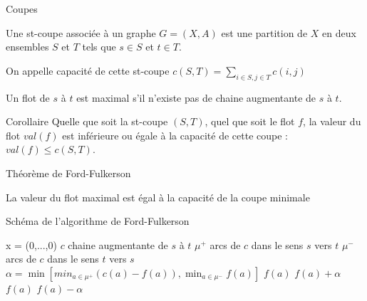 \begin{frame}{Coupes}
    \begin{definition}
        Une st-coupe associée à un graphe $G=(X,A)$ est une partition de $X$ en deux ensembles $S$ et $T$ tels que $s \in S$ et $t \in T$. 
        
        On appelle capacité de cette st-coupe $c(S,T) = \sum_{i \in S, j \in T} c(i,j)$ 
    \end{definition}
    \begin{theorem}
        Un flot de $s$ à $t$ est maximal s'il n'existe pas de chaine augmentante de $s$ à $t$.
    \end{theorem}
    \begin{block}{Corollaire}
        Quelle que soit la st-coupe $(S,T)$, quel que soit le flot $f$, la valeur du flot $val(f)$ est inférieure ou égale à la capacité de cette coupe : $val(f) \leq c(S,T)$.
    \end{block}
\end{frame}

\begin{frame}{Théorème de Ford-Fulkerson}
    \begin{theorem}
        La valeur du flot maximal est égal à la capacité de la coupe minimale 
    \end{theorem}
\end{frame}

\begin{frame}{Schéma de l'algorithme de Ford-Fulkerson}
    \begin{algorithmic}
        \State x = (0,...,0) 
            \State $c$ \gets chaine augmentante de $s$ à $t$
            \State $\mu^+$ \gets arcs de $c$ dans le sens $s$ vers $t$ 
            \State $\mu^-$ \gets arcs de $c$ dans le sens $t$ vers $s$
            \State $\alpha = \min \left[ 
                min_{a \in \mu^+} (c(a) - f(a)) , \min_{a \in \mu^- } f(a)
            \right]$
                $f(a)$ \gets $f(a)+\alpha$
            \EndFor
                $f(a)$ \gets $f(a)-\alpha$
            \EndFor
        \EndWhile
        \EndFunction
    \end{algorithmic}
\end{frame}

